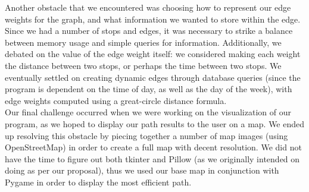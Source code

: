 \documentclass[fontsize=11pt]{article}
\begin{document}
    Another obstacle that we encountered was choosing how to represent our edge weights for the graph, and what information we wanted to store within the edge. Since we had a number of stops and edges, it was necessary to strike a balance between memory usage and simple queries for information. Additionally, we debated on the value of the edge weight itself: we considered making each weight the distance between two stops, or perhaps the time between two stops. We eventually settled on creating dynamic edges through database queries (since the program is dependent on the time of day, as well as the day of the week), with edge weights computed using a great-circle distance formula. \\

    Our final challenge occurred when we were working on the visualization of our program, as we hoped to display our path results to the user on a map. We ended up resolving this obstacle by piecing together a number of map images (using OpenStreetMap) in order to create a full map with decent resolution. We did not have the time to figure out both tkinter and Pillow (as we originally intended on doing as per our proposal), thus we used our base map in conjunction with Pygame in order to display the most efficient path. \\
\end{document}
